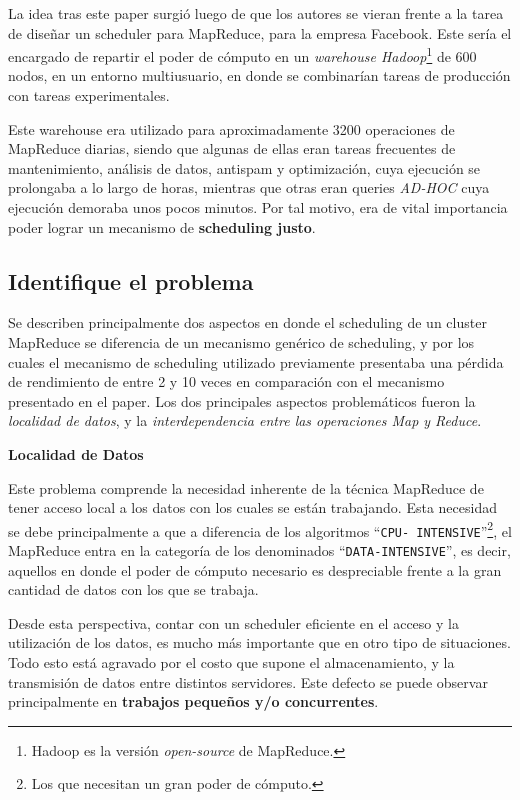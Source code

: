 \documentclass[11pt, a4paper, twoside]{article}
\begin{document}
La idea tras este paper surgió luego de que los autores se vieran frente a la
tarea de diseñar un scheduler para MapReduce, para la empresa Facebook. Este
sería el encargado de repartir el poder de cómputo en un \emph{warehouse
Hadoop}\footnote{Hadoop es la versión \emph{open-source} de MapReduce.} de 600
nodos, en un entorno multiusuario, en donde se combinarían tareas de producción
con tareas experimentales.

Este warehouse era utilizado para aproximadamente 3200 operaciones de MapReduce
diarias, siendo que algunas de ellas eran tareas frecuentes de mantenimiento,
análisis de datos, antispam y optimización, cuya ejecución se prolongaba a lo
largo de horas, mientras que otras eran queries \emph{AD-HOC} cuya ejecución
demoraba unos pocos minutos. Por tal motivo, era de vital importancia poder
lograr un mecanismo de \textbf{scheduling justo}.

\clearpage
\subsection {\footnotesize Identifique el problema}
\label{investigacion-2}

Se describen principalmente dos aspectos en donde el scheduling de un cluster
MapReduce se diferencia de un mecanismo genérico de scheduling, y por los cuales
el mecanismo de scheduling utilizado previamente presentaba una pérdida de
rendimiento de entre 2 y 10 veces en comparación con el mecanismo presentado en
el paper. Los dos principales aspectos problemáticos fueron la \emph{localidad
de datos}, y la \emph{interdependencia entre las operaciones Map y Reduce}.

\begin{center}
\textbf{Localidad de Datos}
\end{center}
Este problema comprende la necesidad inherente de la técnica MapReduce de tener
acceso local a los datos con los cuales se están trabajando. Esta necesidad se
debe principalmente a que a diferencia de los algoritmos ``\texttt{CPU-
INTENSIVE}''\footnote{Los que necesitan un gran poder de cómputo.}, el MapReduce
entra en la categoría de los denominados ``\texttt{DATA-INTENSIVE}'', es decir,
aquellos en donde el poder de cómputo necesario es despreciable frente a la gran
cantidad de datos con los que se trabaja.

Desde esta perspectiva, contar con un scheduler eficiente en el acceso y la
utilización de los datos, es mucho más importante que en otro tipo de
situaciones. Todo esto está agravado por el costo que supone el almacenamiento,
y la transmisión de datos entre distintos servidores. Este defecto se puede
observar principalmente en \textbf{trabajos pequeños y/o concurrentes}.
\end{document}

